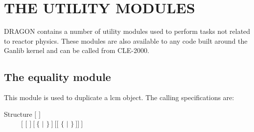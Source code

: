 \section{THE UTILITY MODULES}\label{sect:UtilityModuleInput}

DRAGON contains a number of utility modules used to perform tasks not
related to reactor physics. These modules are also available to any code built
around the Ganlib kernel and can be called from CLE-2000.\cite{ganlib5,cle2000}

\subsection{The equality module}\label{sect:EQUData}

This module is used to duplicate a {\sc lcm} object. The calling specifications
are:

\begin{DataStructure}{Structure }
 \moc{:=} $[$  $]$  \\
~~~~~$[$ \moc{::} $[$   $]~[~\{$  $|$ $\}~]~[[$  $\{$   $|$   $\}~]]~]$ \moc{;} \\
\end{DataStructure}

